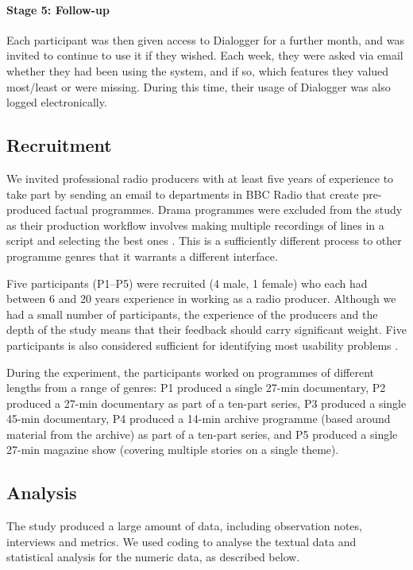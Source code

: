 \paragraph{Stage 5: Follow-up}
    Each participant was then given access to Dialogger for a further month, and was invited to continue to use it if
    they wished. Each week, they were asked via email whether they had been using the system, and if so, which features
    they valued most/least or were missing.  During this time, their usage of Dialogger was also logged electronically.

\subsection{Recruitment}

We invited professional radio producers with at least five years of experience to take part by sending an email to
departments in BBC Radio that create pre-produced factual programmes.  Drama programmes were excluded from the study as
their production workflow involves making multiple recordings of lines in a script and selecting the best ones
\citep{Baume2015}. This is a sufficiently different process to other programme genres that it warrants a different
interface.

Five participants (P1--P5) were recruited (4 male, 1 female) who each had between 6 and 20 years experience in working
as a radio producer. Although we had a small number of participants, the experience of the producers and the depth of
the study means that their feedback should carry significant weight. Five participants is also considered sufficient
for identifying most usability problems \citep{Nielsen1993}.

During the experiment, the participants worked on programmes of different
lengths from a range of genres:
P1 produced a single 27-min documentary, %
P2 produced a 27-min documentary as part of a ten-part series,
P3 produced a single 45-min documentary,
P4 produced a 14-min archive programme
(based around material from the archive) as part of a ten-part series, and
P5 produced a single 27-min magazine show (covering multiple stories on a
single theme).

\subsection{Analysis}
The study produced a large amount of data, including observation notes, interviews and metrics. We used coding to
analyse the textual data and statistical analysis for the numeric data, as described below.

